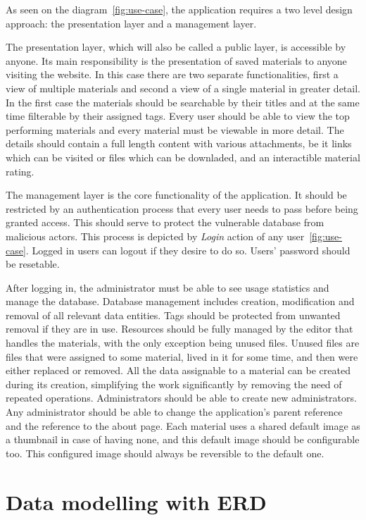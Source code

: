 \documentclass[
  digital,     %
  oneside,     %
  nosansbold,  %
  colorbold, %
  lof,         %
  lot,         %
]{fithesis4}
\begin{document}
As seen on the diagram~\ref{fig:use-case}, the application requires a two level design approach: the presentation layer and a management layer.

The presentation layer, which will also be called a public layer, is accessible by anyone. Its main responsibility is the presentation of saved materials to anyone visiting the website. In this case there are two separate functionalities, first a view of multiple materials and second a view of a single material in greater detail. In the first case the materials should be searchable by their titles and at the same time filterable by their assigned tags. Every user should be able to view the top performing materials and every material must be viewable in more detail. The details should contain a full length content with various attachments, be it links which can be visited or files which can be downladed, and an interactible material rating.

The management layer is the core functionality of the application. It should be restricted by an authentication process that every user needs to pass before being granted access. This should serve to protect the vulnerable database from malicious actors. This process is depicted by \textit{Login} action of any user~\ref{fig:use-case}. Logged in users can logout if they desire to do so. Users' password should be resetable.

After logging in, the administrator must be able to see usage statistics and manage the database. Database management includes creation, modification and removal of all relevant data entities. Tags should be protected from unwanted removal if they are in use. Resources should be fully managed by the editor that handles the materials, with the only exception being unused files. Unused files are files that were assigned to some material, lived in it for some time, and then were either replaced or removed. All the data assignable to a material can be created during its creation, simplifying the work significantly by removing the need of repeated operations. Administrators should be able to create new administrators. Any administrator should be able to change the application's parent reference and the reference to the about page. Each material uses a shared default image as a thumbnail in case of having none, and this default image should be configurable too. This configured image should always be reversible to the default one.

\section{Data modelling with ERD}
\end{document}
